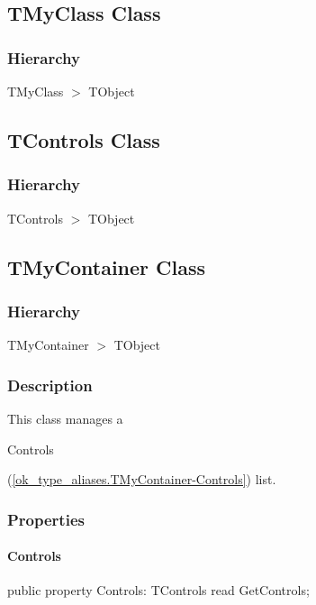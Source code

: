 \documentclass{report}
\begin{document}
\subsection*{TMyClass Class}
\subsubsection*{\large{\textbf{Hierarchy}}\normalsize\hspace{1ex}\hfill}
TMyClass {$>$} TObject
\subsection*{TControls Class}
\subsubsection*{\large{\textbf{Hierarchy}}\normalsize\hspace{1ex}\hfill}
TControls {$>$} TObject
\subsection*{TMyContainer Class}
\subsubsection*{\large{\textbf{Hierarchy}}\normalsize\hspace{1ex}\hfill}
TMyContainer {$>$} TObject
\subsubsection*{\large{\textbf{Description}}\normalsize\hspace{1ex}\hfill}
This class manages a \begin{ttfamily}Controls\end{ttfamily}(\ref{ok_type_aliases.TMyContainer-Controls}) list.\subsubsection*{\large{\textbf{Properties}}\normalsize\hspace{1ex}\hfill}
\paragraph*{Controls}\hspace*{\fill}

\begin{list}{}{
\setlength{\itemindent}{0cm}
\setlength{\listparindent}{0cm}
\setlength{\leftmargin}{\evensidemargin}
\addtolength{\leftmargin}{\tmplength}
\settowidth{\labelsep}{X}
\addtolength{\leftmargin}{\labelsep}
\setlength{\labelwidth}{\tmplength}
}
\begin{flushleft}
\item[\textbf{Declaration}\hfill]
\begin{ttfamily}
public property Controls: TControls read GetControls;\end{ttfamily}


\end{flushleft}
\end{list}
\end{document}

